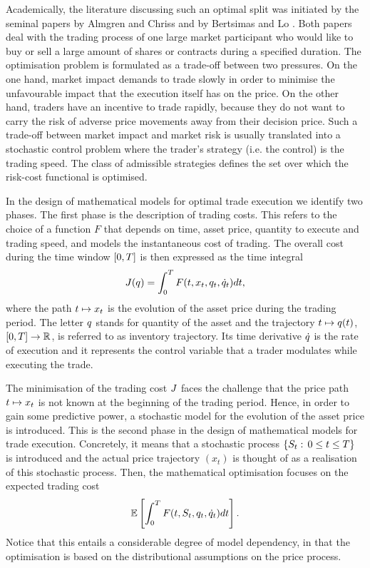 \documentclass[10pt,a4paper]{article}
\begin{document}
Academically, the literature discussing such an optimal split  was initiated by the seminal papers by Almgren and Chriss \cite{AC00opt} and by Bertsimas and Lo \cite{BL98opt}. Both papers deal with 
the trading process of one large market participant  who would like to buy or sell a large amount of shares or contracts during a specified duration. 
The optimisation problem is formulated as a trade-off between two pressures. On the one hand, market impact  demands to trade slowly in order to minimise the unfavourable impact that the execution itself has on the price. 
On the other hand, traders have an incentive to trade rapidly, because they do not want to carry the risk of adverse price movements away from their decision price. Such a  trade-off between market impact and market risk is usually translated into a stochastic control problem where the trader's strategy (i.e. the control) is the trading speed. The class of admissible strategies defines  the set over which the risk-cost functional is optimised. 

In the design of mathematical models for optimal trade execution we identify two phases. The first phase is the description of trading costs. This refers to the choice of a function $F$ that depends on time, asset price, quantity to execute and trading speed, and models the instantaneous cost of trading. The overall cost during the time window ${[0,T]}$ is then expressed as the time integral
\[
J(q) = \int_{0}^{T}
F(t,x_t,q_t,\dot{q}_t)dt,
\]
where the path $t \mapsto x_t$ is the evolution of the asset price during the trading period. The letter $q$ stands for quantity of the asset and the trajectory $t\mapsto q(t)$, ${[0,T]} \rightarrow \mathbb{R}$, is referred to as inventory trajectory. Its time derivative $\dot{q}$ is the rate of execution and it represents the control variable that a trader modulates while executing the trade. 

The minimisation of the trading cost $J$ faces the challenge that the price path $t \mapsto x_t$ is not known at the beginning of the trading period. Hence, in order to gain some predictive power, a stochastic model for the evolution of the asset price is introduced. This is the second phase in the design of  mathematical models for trade execution. Concretely, it means that a stochastic process $\lbrace S_t: \, 0\leq t \leq T \rbrace$ is introduced and the actual price trajectory $(x_t)$ is thought of as a realisation of this stochastic process. Then, the mathematical optimisation focuses on the expected trading cost
\begin{equation}\label{eq.expectedTradingCost}
\mathbb{{E}}\left[
\int_{0}^{T} F(t,S_t, q_t,\dot{q}_{t}) dt
\right]. 
\end{equation}
Notice that this entails a considerable degree of model dependency, in that the optimisation is based on the distributional assumptions on the price process. 
\end{document}

